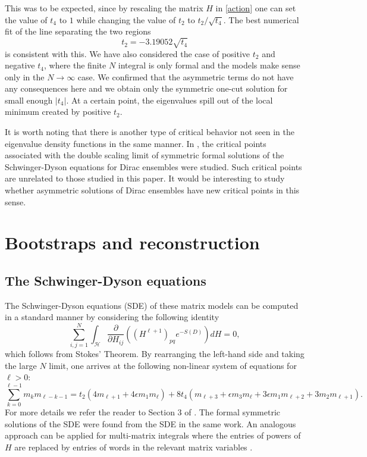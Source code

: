 \documentclass[10pt]{article}
\theoremstyle{plain}
\theoremstyle{definition}
\theoremstyle{plain}
\begin{document}
This was to be expected, since by rescaling the matrix $H$ in \eqref{action} one can set the value of $t_4$ to $1$ while changing the value of $t_2$ to $t_2/\sqrt{t_4}$. The best numerical fit of the line separating the two regions 
\begin{equation}\label{trafo}
t_2=- 3.19052 \sqrt{t_4}
\end{equation}
is consistent with this. We have also considered the case of positive $t_2$ and negative $t_4$, where the finite $N$ integral is only formal and the models make sense only in the $N\to\infty$ case. We confirmed that the asymmetric terms do not have any consequences here and we obtain only the symmetric one-cut solution for small enough $|t_4|$. At a certain point, the eigenvalues spill out of the local minimum created by positive $t_2$.

It is worth noting that there is another type of critical behavior not seen in the eigenvalue density functions in the same manner. In \cite{hessam2023double,khalkhali2024coloured}, the critical points associated with the double scaling limit of symmetric formal solutions of the Schwinger-Dyson equations for Dirac ensembles were studied. Such critical points are unrelated to those studied in this paper. It would be interesting to study whether asymmetric solutions of Dirac ensembles have new critical points in this sense.

\section{Bootstraps and reconstruction}\label{sec:bootstraps}
\subsection{The Schwinger-Dyson equations}
The Schwinger-Dyson equations (SDE) of these matrix models can be computed in a standard manner by considering the following identity 
\begin{equation*}
 \sum_{i,j=1}^{N}\int_{\mathcal{H}}\frac{\partial}{\partial H_{i j}}\left((H^{\ell+1})_{p q} e^{-S(D)} \right)dH = 0,
\end{equation*}
which follows from Stokes' Theorem. By rearranging the left-hand side and taking the large $N$ limit, one arrives at the following non-linear system of equations for $\ell>0$:
\begin{equation*}
 \sum_{k=0}^{\ell-1} m_k m_{\ell-k-1}=t_{2}\left(4 m_{\ell+1}+ 4 \epsilon m_1 m_{\ell}\right)+8t_{4}(m_{\ell+3}+ \epsilon m_3 m_{\ell}+ 3\epsilon m_1 m_{\ell+2}+3 m_2 m_{\ell+1}).
\end{equation*}
For more details we refer the reader to Section 3 of \cite{hessam2023double}. The formal symmetric solutions of the SDE were found from the SDE in the same work. An analogous approach can be applied for multi-matrix integrals where the entries of powers of $H$ are replaced by entries of words in the relevant matrix variables \cite{khalkhali2024coloured}.
\end{document}
